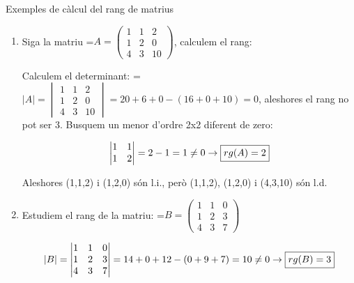 \documentclass[11pt,a4paper]{article}
\newcommand{\fmm}[1]{\setbox0=\hbox{$#1$}\ifdim\wd0>\linewidth\fmdisp{#1}\else\mbox{\box0}\fi}
\newcommand{\fmdisp}[1]{\[\setbox2=\hbox{$\displaystyle #1$}\ifdim\wd2>\linewidth\resizebox{\linewidth}{!}{\box2}\else\box2\fi\]}
\begin{document}
\begin{fmex}{Exemples de càlcul del rang de matrius}
\begin{enumerate}[label=\textbf{\arabic*.},leftmargin=*]
En ser zero tots aquests, es dedueix que \textbf{la tercera fila és combinació lineal de les dues primeres.}

(Si algun d'aquests tres menors fora no nul, la tercera fila seria l.i. de les dues primeres. Prendríem com a base aquest menor d'ordre 3 i ampliaríem les tres columnes amb els elements corresponents de la quarta fila. Obtindríem així tres columnes de quatre elements. Afegint-hi una altra columna, provaríem si algun dels menors d'ordre 4 era no nul.)

Ara farem amb la quarta fila el mateix que hem fet amb la tercera. Els tres menors d'ordre 3 que així s'obtenen són zero. Per tant, \textbf{la quarta fila és, també, combinació lineal de les dues primeres.}

El rang de la matriu és dos (màxim ordre d'un menor no nul o, el que és el mateix, màxim nombre de files l.i.). Aleshores \fmm{\boxed{rg(A)=2}}.
\item Siga la matriu \fmm{A=\begin{pmatrix}1 & 1 & 2\\ 1 & 2 & 0\\ 4 & 3 & 10\end{pmatrix}}, calculem el rang:

Calculem el determinant: \fmm{|A|=\begin{vmatrix}1 & 1 & 2\\ 1 & 2 & 0\\ 4 & 3 & 10\end{vmatrix}=20+6+0-(16+0+10)=0}, aleshores el rang no pot ser 3. Busquem un menor d'ordre 2x2 diferent de zero:

\fmdisp{\begin{vmatrix}1 & 1\\ 1 & 2\end{vmatrix}=2-1=1\neq0\rightarrow\boxed{rg(A)=2}}

Aleshores (1,1,2) i (1,2,0) són l.i., però (1,1,2), (1,2,0) i (4,3,10) són l.d.
\item Estudiem el rang de la matriu: \fmm{B=\begin{pmatrix}1 & 1 & 0\\ 1 & 2 & 3\\ 4 & 3 & 7\end{pmatrix}}

\fmdisp{|B|=\begin{vmatrix}1 & 1 & 0\\ 1 & 2 & 3\\ 4 & 3 & 7\end{vmatrix}=14+0+12-(0+9+7)=10\neq0\rightarrow\boxed{rg(B)=3}}


\end{enumerate}
\end{fmex}
\end{document}
